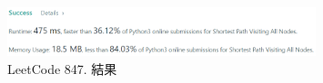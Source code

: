 \documentclass[10pt,UTF8]{ctexart}
\begin{document}
\begin{figure}[H]
\centering 
\includegraphics[width=0.80\textwidth]{lc-847-o.png} 
\caption{LeetCode 847. 結果}
\label{Test}
\end{figure}












\clearpage
\end{document}
